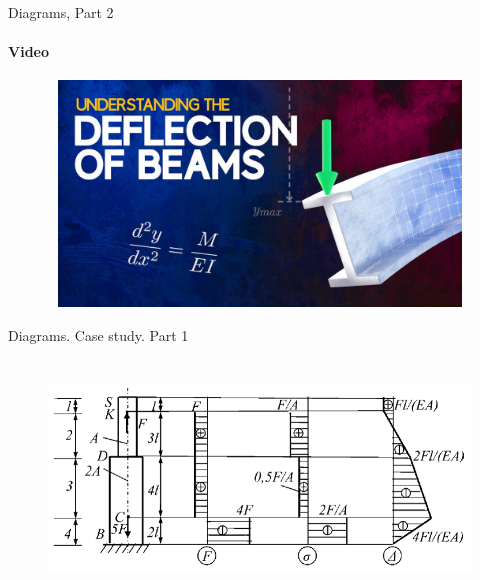 \documentclass[aspectratio=169]{beamer}
\begin{document}
\begin{frame}[t]{Diagrams, Part 2}
    \framesubtitle{Video}
    \vspace{-0.6cm}
    \begin{figure}[H]
        \href{https://youtu.be/MvBqCeZllpQ}{
            \centering\includegraphics[height=6cm,width=1\textwidth,keepaspectratio]{diagrams2_video.jpg}}
        \label{fig:diagrams2_video.jpg}
    \end{figure}
\end{frame}

\begin{frame}[t]{Diagrams. Case study. Part 1}
\framesubtitle{}
    \vspace{-0.6cm}
    \begin{figure}[H]
        \centering\includegraphics[height=6cm,width=1\textwidth,keepaspectratio]{diagram_task.png}
        \label{fig:diagram_task.png}
    \end{figure}
\end{frame}
\end{document}
